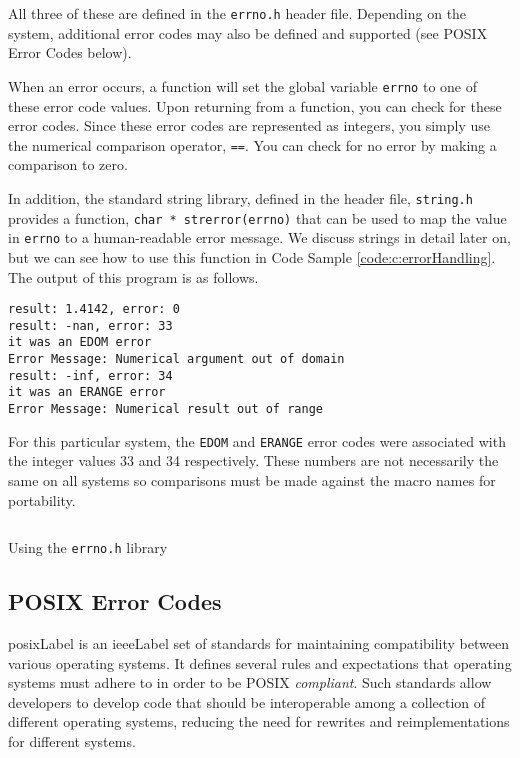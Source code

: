 All three of these are defined in the \texttt{errno.h} header file.
Depending on the system, additional error codes may also be defined
and supported (see POSIX Error Codes below).  

When an error occurs, a function will set the global variable 
\texttt{errno} to one of these error code values.  Upon returning 
from a function, you can check for these error codes.  Since these 
error codes are represented as integers, you simply use the numerical 
comparison operator, \texttt{==}.  You can check for no error
by making a comparison to zero.

In addition, the standard string library, defined in the header file, 
\texttt{string.h} provides a function, 
\texttt{char * strerror(errno)} that can be used to map 
the value in \texttt{errno} to a human-readable error message.  
We discuss strings in detail later on, but we can see how to use this 
function in Code Sample \ref{code:c:errorHandling}.  The output of 
this program is as follows.

\begin{verbatim}
result: 1.4142, error: 0
result: -nan, error: 33
it was an EDOM error
Error Message: Numerical argument out of domain
result: -inf, error: 34
it was an ERANGE error
Error Message: Numerical result out of range
\end{verbatim}

For this particular system, the \texttt{EDOM} and 
\texttt{ERANGE} error codes were associated with the
integer values 33 and 34 respectively.  These numbers are 
not necessarily the same on all systems so comparisons must 
be made against the macro names for portability.

\begin{listing}
\inputminted{c}{code/errorDemo.c}
\caption{Using the \texttt{errno.h} library}
\label{code:c:errorHandling}
\end{listing}

\subsection{POSIX Error Codes}

\gls{posixLabel} is an \gls{ieeeLabel} set of standards for maintaining compatibility between
various operating systems.  It defines several rules and expectations
that operating systems must adhere to in order to be POSIX 
\emph{compliant}.  Such standards allow developers to develop 
code that should be interoperable among a collection of different
operating systems, reducing the need for rewrites and reimplementations
for different systems.

